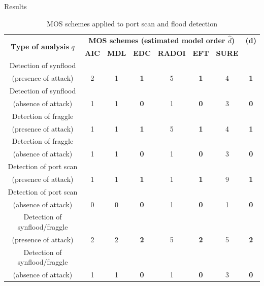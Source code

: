 \documentclass[newPxFont, numfooter, sectionpages]{beamer}
\begin{document}
\begin{frame}{Results}
	
	\begin{table}[h!]
	  \centering
	  \tiny
	  \caption{MOS schemes applied to port scan and flood detection}
	  \label{tab:tab4}
	  \begin{tabular}{ c c c c c c c c }
		\toprule
		\multirow{2}{*}{\textbf{Type of analysis} $q$} &\multicolumn{6}{c}{\textbf{MOS schemes (estimated model order $\hat{d}$)}} &{\textbf{(d)}}\\ 
				\hhline{~------~}
			&\textbf{AIC} &\textbf{MDL} &\textbf{EDC} &\textbf{RADOI} &\textbf{EFT} &\textbf{SURE}\\
		\midrule
		Detection of synflood \\(presence of attack) &2 &1 &\textbf{\color{red}1} &5 &\textbf{\color{red}1} &4 &\textbf{\color{red}1} \\
		Detection of synflood \\(absence of attack) &1 &1 &\textbf{\color{red}0} &1 &\textbf{\color{red}0} &3 &\textbf{\color{red}0} \\
		\midrule
		Detection of fraggle \\(presence of attack) &1 &1 &\textbf{\color{red}1} &5 &\textbf{\color{red}1} &4 &\textbf{\color{red}1} \\
		Detection of fraggle \\(absence of attack) &1 &1 &\textbf{\color{red}0} &1 &\textbf{\color{red}0} &3 &\textbf{\color{red}0} \\
		\midrule
		Detection of port scan \\(presence of attack) &1 &1 &\textbf{\color{red}1} &1 &\textbf{\color{red}1} &9 &\textbf{\color{red}1} \\
		Detection of port scan \\(absence of attack) &0 &0 &\textbf{\color{red}0} &1 &\textbf{\color{red}0} &1 &\textbf{\color{red}0} \\
		\midrule
		Detection of synflood/fraggle \\(presence of attack) &2 &2 &\textbf{\color{red}2} &5 &\textbf{\color{red}2} &5 &\textbf{\color{red}2} \\
		Detection of synflood/fraggle \\(absence of attack) &1 &1 &\textbf{\color{red}0} &1 &\textbf{\color{red}0} &3 &\textbf{\color{red}0} \\
	    \bottomrule
	  \end{tabular}
	\end{table}

\end{frame}
\end{document}
